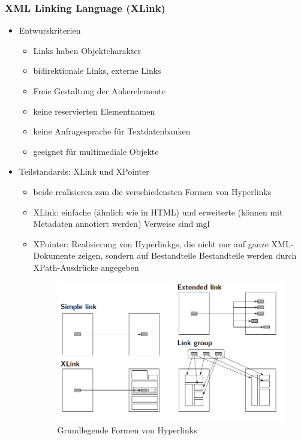 \subsubsection{XML Linking Language (XLink)}
\begin{itemize}
	\item Entwurskriterien
	\begin{itemize}
		\item Links haben Objektcharakter
		\item bidirektionale Links, externe Links
		\item Freie Gestaltung der Ankerelemente
		\item keine reservierten Elementnamen
		\item keine Anfragesprache für Textdatenbanken
		\item geeignet für multimediale Objekte
	\end{itemize}
	
	\item Teilstandards: XLink und XPointer
	\begin{itemize}
		\item beide realisieren zsm die verschiedensten Formen von Hyperlinks
		\item XLink: einfache (ähnlich wie in HTML) und erweiterte (können mit Metadaten annotiert werden) Verweise sind mgl
		\item XPointer: Realisierung von Hyperlinkgs, die nicht nur auf ganze XML-Dokumente zeigen, sondern auf Bestandteile
		Bestandteile werden durch XPath-Ausdrücke angegeben
		\begin{figure}[!h]
			\centering
			\includegraphics[scale=0.4]{img/hyperlink_types.png}
			\caption{Grundlegende Formen von Hyperlinks}
		\end{figure}
	\end{itemize}
	

\end{itemize}
